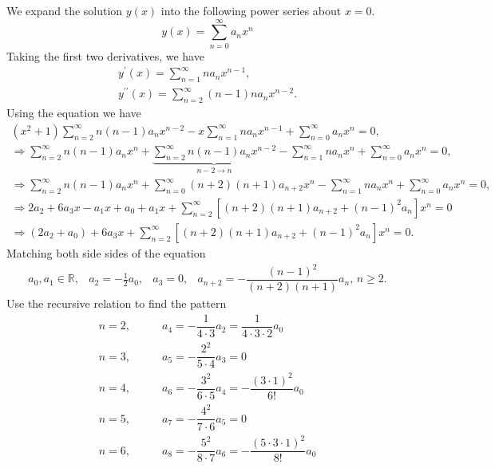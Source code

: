 \documentclass[11pt]{article}
\begin{document}
\begin{solution}
 We expand the solution $y(x)$ into the following power series about $x=0$.
\begin{equation*}
y(x) = \sum_{n=0}^{\infty} a_{n} x^n
\end{equation*}
Taking the first two derivatives, we have
\begin{gather*}
y^{\prime}(x) =  \sum_{n=1}^{\infty} n a_{n} x^{n-1}, \\
y^{\prime \prime}(x) = \sum_{n=2}^{\infty} (n-1)n a_{n} x^{n-2}.
\end{gather*}
Using the equation we have
\begin{gather*}
(x^2 + 1)\sum_{n=2}^{\infty}n(n-1)a_{n}x^{n-2} -x \sum_{n=1}^{\infty} na_{n}x^{n-1} + \sum_{n=0}^{\infty} a_{n}x^{n} = 0, \\
\Rightarrow \sum_{n=2}^{\infty}n(n-1)a_{n}x^{n} + \underbrace{\sum_{n=2}^{\infty}n(n-1)a_{n}x^{n-2}}_{n-2\rightarrow n} - \sum_{n=1}^{\infty} na_{n}x^{n} + \sum_{n=0}^{\infty} a_{n}x^{n} = 0, \\
\Rightarrow \sum_{n=2}^{\infty}n(n-1)a_{n}x^{n} + \sum_{n=0}^{\infty}(n+2)(n+1)a_{n+2}x^{n} - \sum_{n=1}^{\infty} na_{n}x^{n} + \sum_{n=0}^{\infty} a_{n}x^{n} = 0, \\
\Rightarrow 2a_{2} + 6 a_{3}x - a_{1}x + a_{0} + a_{1}x + \sum_{n=2}^{\infty}[(n+2)(n+1)a_{n+2} + (n-1)^{2}a_{n}]x^{n} =0 \\
\Rightarrow (2a_{2} + a_{0}) + 6 a_{3} x + \sum_{n=2}^{\infty}[(n+2)(n+1)a_{n+2} + (n-1)^{2}a_{n}]x^{n} =0.
\end{gather*}
Matching both side sides  of the equation
\begin{equation*}
\begin{array}{cccc}
a_{0},a_{1}\in \mathbb{R}, & a_{2}=-\frac{1}{2}a_{0}, & a_{3}=0, & a_{n+2}=-\dfrac{(n-1)^{2}}{(n+2)(n+1)}a_{n},\,n\geq 2.
\end{array}
\end{equation*}
Use the recursive relation to find the pattern
\begin{align*}
n=2, & \qquad a_{4}=-\dfrac{1}{4\cdot 3} a_{2} = \dfrac{1}{4\cdot 3\cdot 2}a_{0}\\
n=3, & \qquad a_{5}=-\dfrac{2^{2}}{5\cdot 4} a_{3} = 0\\
n=4, & \qquad a_{6}=-\dfrac{3^{2}}{6\cdot 5} a_{4} = -\dfrac{(3\cdot 1)^{2}}{6!}a_{0}\\
n=5, & \qquad a_{7}=-\dfrac{4^{2}}{7\cdot 6} a_{5} = 0\\
n=6, & \qquad a_{8}=-\dfrac{5^{2}}{8\cdot 7} a_{6} = -\dfrac{(5\cdot 3\cdot 1)^{2}}{8!}a_{0}

\end{align*}
\end{solution}
\end{document}
